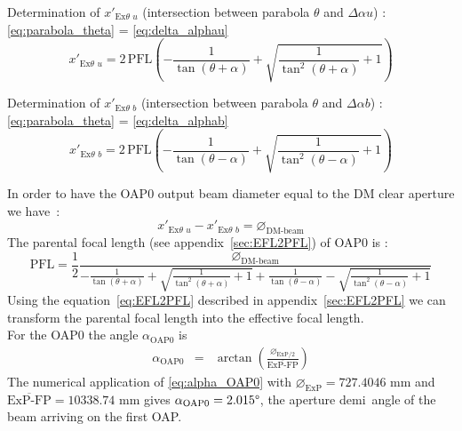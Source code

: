 \documentclass[12pt,a4paper]{article}
\begin{document}
Determination of $x'_{\text{Ex}\theta\,\,u}$ (intersection between parabola $\theta$ and $\Delta\alpha u$) :\\ \eqref{eq:parabola_theta} = \eqref{eq:delta_alphau}\\
\begin{equation}
	x'_{\text{Ex}\theta\,\,u} = 2\,\text{PFL}\left(-\frac{1}{\tan\left(\theta+\alpha\right)}+\sqrt{\frac{1}{\tan^2\left(\theta+\alpha\right)}+1}\right)
\end{equation}

Determination of $x'_{\text{Ex}\theta\,\,b}$ (intersection between parabola $\theta$ and $\Delta\alpha b$) :\\ \eqref{eq:parabola_theta} = \eqref{eq:delta_alphab}\\
\begin{equation}
	x'_{\text{Ex}\theta\,\,b} = 2\,\text{PFL}\left(-\frac{1}{\tan\left(\theta-\alpha\right)}+\sqrt{\frac{1}{\tan^2\left(\theta-\alpha\right)}+1}\right)
\end{equation}

In order to have the OAP0 output beam diameter equal to the DM clear aperture we have~:
\begin{equation}
	x'_{\text{Ex}\theta\,\,u}-x'_{\text{Ex}\theta\,\,b} = \diameter_\text{DM-beam}
\end{equation}
The parental focal length (see appendix~\ref{sec:EFL2PFL}) of OAP0 is :
\begin{equation}
	\text{PFL} = \frac{1}{2}\frac{\diameter_\text{DM-beam}}{-\frac{1}{\tan\left(\theta+\alpha\right)}+\sqrt{\frac{1}{\tan^2\left(\theta+\alpha\right)}+1}+\frac{1}{\tan\left(\theta-\alpha\right)}-\sqrt{\frac{1}{\tan^2\left(\theta-\alpha\right)}+1}}
\end{equation}
Using the equation~\eqref{eq:EFL2PFL} described in appendix~\ref{sec:EFL2PFL} we can transform the parental focal length into the effective focal length.\\

For the OAP0 the angle $\alpha_{\text{OAP0}}$ is
\begin{eqnarray}\label{eq:alpha_OAP0}
	\alpha_{\text{OAP0}} &= &\arctan\left(\frac{\diameter_{\text{ExP}/2}}{\overline{\text{ExP-FP}}}\right)
\end{eqnarray} 
The numerical application of \eqref{eq:alpha_OAP0} with $\diameter_{\text{ExP}} = 727.4046$ mm and $\overline{\text{ExP-FP}} = 10338.74$ mm gives $\alpha_{\text{OAP0}}  = 2.015\degree$, the aperture demi~angle of the beam arriving on the first OAP.\\
\end{document}
